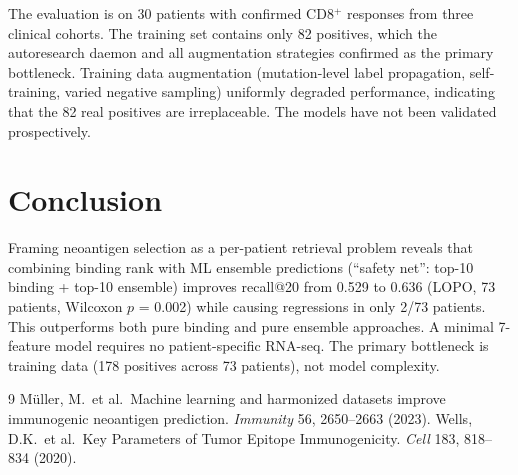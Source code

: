 \documentclass[11pt,twocolumn]{article}
\begin{document}
The evaluation is on 30 patients with confirmed CD8$^{+}$ responses from three clinical cohorts. The training set contains only 82 positives, which the autoresearch daemon and all augmentation strategies confirmed as the primary bottleneck. Training data augmentation (mutation-level label propagation, self-training, varied negative sampling) uniformly degraded performance, indicating that the 82 real positives are irreplaceable. The models have not been validated prospectively.

\section{Conclusion}

Framing neoantigen selection as a per-patient retrieval problem reveals that combining binding rank with ML ensemble predictions (``safety net'': top-10 binding + top-10 ensemble) improves recall@20 from 0.529 to 0.636 (LOPO, 73 patients, Wilcoxon $p$ = 0.002) while causing regressions in only 2/73 patients. This outperforms both pure binding and pure ensemble approaches. A minimal 7-feature model requires no patient-specific RNA-seq. The primary bottleneck is training data (178 positives across 73 patients), not model complexity.

\begin{thebibliography}{9}
 M\"{u}ller, M.\ et al.\ Machine learning and harmonized datasets improve immunogenic neoantigen prediction. \textit{Immunity} 56, 2650--2663 (2023).
 Wells, D.K.\ et al.\ Key Parameters of Tumor Epitope Immunogenicity. \textit{Cell} 183, 818--834 (2020).
\end{thebibliography}
\end{document}
